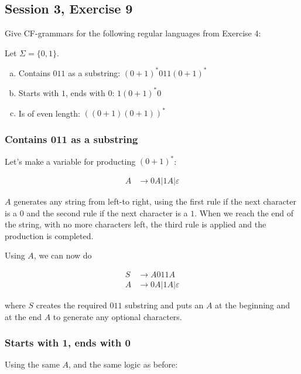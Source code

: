 \subsection{Session 3, Exercise 9}


Give CF-grammars for the following regular languages from Exercise 4:

Let $\Sigma=\{0,1\}$.

\begin{enumerate}[a.)]
\item Contains $011$ as a substring: $(0+1)^*011(0+1)^*$
\item Starts with $1$, ends with $0$: $1(0+1)^*0$
\item Is of even length: $((0+1)(0+1))^*$
\end{enumerate}


\subsubsection{Contains 011 as a substring}

Let's make a variable for producting $(0+1)^*$:

\begin{align*}
A &\rightarrow 0A|1A|\varepsilon
\end{align*}

$A$ generates any string from left-to right, using the first rule if the next character is a $0$ and the second rule if the next character is a $1$. When we reach the end of the string, with no more characters left, the third rule is applied and the production is completed.

Using $A$, we can now do

\begin{align*}
S &\rightarrow A011A\\
A &\rightarrow 0A|1A|\varepsilon
\end{align*}

where $S$ creates the required $011$ substring and puts an $A$ at the beginning and at the end $A$ to generate any optional characters.

\subsubsection{Starts with 1, ends with 0}

Using the same $A$, and the same logic as before:

